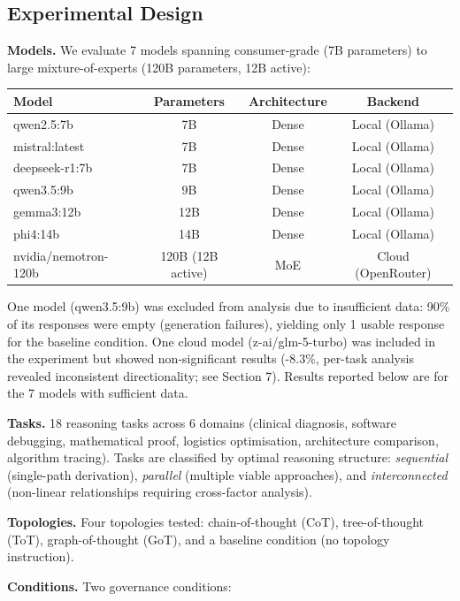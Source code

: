 \documentclass[11pt,a4paper]{article}
\begin{document}
\subsection{Experimental Design}\label{experimental-design}

\textbf{Models.} We evaluate 7 models spanning consumer-grade (7B
parameters) to large mixture-of-experts (120B parameters, 12B active):

{\small\begin{longtable}[]{@{}lccc@{}}
\toprule\noalign{}
Model & Parameters & Architecture & Backend \\
\midrule\noalign{}
\endhead
\bottomrule\noalign{}
\endlastfoot
qwen2.5:7b & 7B & Dense & Local (Ollama) \\
mistral:latest & 7B & Dense & Local (Ollama) \\
deepseek-r1:7b & 7B & Dense & Local (Ollama) \\
qwen3.5:9b & 9B & Dense & Local (Ollama) \\
gemma3:12b & 12B & Dense & Local (Ollama) \\
phi4:14b & 14B & Dense & Local (Ollama) \\
nvidia/nemotron-120b & 120B (12B active) & MoE & Cloud (OpenRouter) \\
\end{longtable}}

One model (qwen3.5:9b) was excluded from analysis due to insufficient
data: 90\% of its responses were empty (generation failures), yielding
only 1 usable response for the baseline condition. One cloud model
(z-ai/glm-5-turbo) was included in the experiment but showed
non-significant results (-8.3\%, per-task analysis revealed inconsistent
directionality; see Section 7). Results reported below are for the 7
models with sufficient data.

\textbf{Tasks.} 18 reasoning tasks across 6 domains (clinical diagnosis,
software debugging, mathematical proof, logistics optimisation,
architecture comparison, algorithm tracing). Tasks are classified by
optimal reasoning structure: \emph{sequential} (single-path derivation),
\emph{parallel} (multiple viable approaches), and \emph{interconnected}
(non-linear relationships requiring cross-factor analysis).

\textbf{Topologies.} Four topologies tested: chain-of-thought (CoT),
tree-of-thought (ToT), graph-of-thought (GoT), and a baseline condition
(no topology instruction).

\textbf{Conditions.} Two governance conditions:
\end{document}
